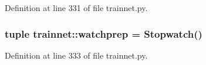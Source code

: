 Definition at line 331 of file trainnet.py.

\hypertarget{namespacetrainnet_ad40ddd24354da1881bc9fe8b6547b5fa}{
\subsubsection[{watchprep}]{\setlength{\rightskip}{0pt plus 5cm}tuple {\bf trainnet::watchprep} = Stopwatch()}}
\label{namespacetrainnet_ad40ddd24354da1881bc9fe8b6547b5fa}


Definition at line 333 of file trainnet.py.


